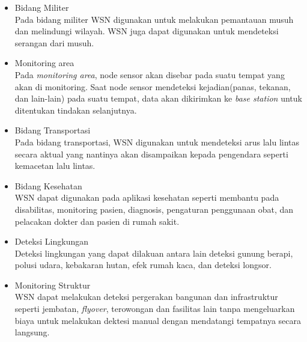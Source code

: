 \documentclass[a4paper,twoside]{article}
\begin{document}
\begin{enumerate}
\begin{itemize}
\begin{itemize}
\item Bidang Militer\\
Pada bidang militer WSN digunakan untuk melakukan pemantauan musuh dan melindungi wilayah. WSN juga dapat digunakan untuk mendeteksi serangan dari musuh.

\item Monitoring area\\
Pada \textit{monitoring area}, node sensor akan disebar pada suatu tempat yang akan di monitoring. Saat node sensor mendeteksi kejadian(panas, tekanan, dan lain-lain) pada suatu tempat, data akan dikirimkan ke \textit{base station} untuk ditentukan tindakan selanjutnya.

\item Bidang Transportasi\\
Pada bidang transportasi, WSN digunakan untuk mendeteksi arus lalu lintas secara aktual yang nantinya akan disampaikan kepada pengendara seperti kemacetan lalu lintas. 

\item Bidang Kesehatan\\
WSN dapat digunakan pada aplikasi kesehatan seperti membantu pada disabilitas, monitoring pasien, diagnosis, pengaturan penggunaan obat, dan pelacakan dokter dan pasien di rumah sakit.

\item Deteksi Lingkungan\\
Deteksi lingkungan yang dapat dilakuan antara lain deteksi gunung berapi, polusi udara, kebakaran hutan, efek rumah kaca, dan deteksi longsor.

\item Monitoring Struktur\\
WSN dapat melakukan deteksi pergerakan bangunan dan infrastruktur seperti jembatan, \textit{flyover}, terowongan dan fasilitas lain tanpa mengeluarkan biaya untuk melakukan dektesi manual dengan mendatangi tempatnya secara langsung.


\end{itemize}
\end{itemize}
\end{enumerate}
\end{document}
